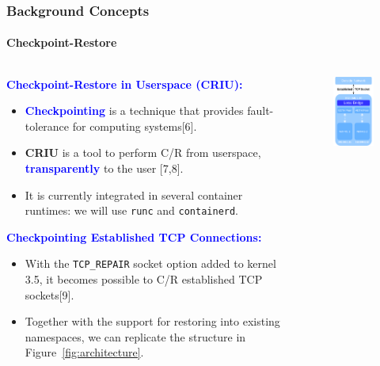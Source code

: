 \documentclass[9pt,    %
    english,            %
    xcolor=table,       %
    envcountsect,        %
    aspectratio=169     %
]{beamer}
\begin{document}
\begin{frame}
    \frametitle{Background Concepts}
    \framesubtitle{Checkpoint-Restore}

    \begin{columns}[t]
        \begin{column}{.65\textwidth}
            \textbf{\textcolor{blue}{Checkpoint-Restore in Userspace (CRIU):}}
            \begin{itemize}
                \item \textbf{\textcolor{blue}{Checkpointing}} is a technique that provides fault-tolerance for computing systems[6].
                \item \textbf{CRIU} is a tool to perform C/R from userspace, \textbf{\textcolor{blue}{transparently}} to the user [7,8].
                \item It is currently integrated in several container runtimes: we will use \texttt{runc} and \texttt{containerd}.
            \end{itemize}
            \textbf{\textcolor{blue}{Checkpointing Established TCP Connections:}}
            \begin{itemize}
                \item With the \texttt{TCP\_REPAIR} socket option added to kernel 3.5, it becomes possible to C/R established TCP sockets[9].
                \item Together with the support for restoring into existing namespaces, we can replicate the structure in Figure~\ref{fig:architecture}.
            \end{itemize}
        \end{column}
        \begin{column}{.3\textwidth}
            \vspace{-20pt}
            \begin{figure}[t!]
                \includegraphics[width=.6\textwidth]{./images/tcp_arch.png}

\end{figure}
\end{column}
\end{columns}
\end{frame}
\end{document}
